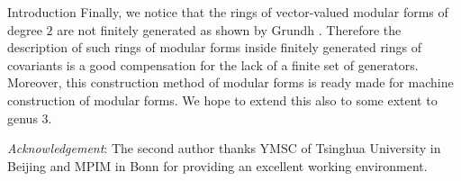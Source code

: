 \documentclass[12pt]{amsart}
\numberwithin{equation}{section}
\numberwithin{equation}{section}
\theoremstyle{definition}
\theoremstyle{remark}
\begin{document}
\begin{section}{Introduction}
Finally, we notice that the rings of vector-valued modular forms of degree $2$
are not finitely generated as shown by Grundh \cite[p.\ 234]{BGHZ}. Therefore the description
of such rings of modular forms inside finitely generated rings of covariants
is a good compensation for the lack of a finite set of generators. 
Moreover, this construction method of modular forms is ready made for 
machine construction of modular forms.
We hope to extend  this also to some extent to genus $3$.

\bigskip

{\sl Acknowledgement}:
The second author thanks YMSC of Tsinghua University in Beijing and MPIM in Bonn
for providing an excellent working environment.
\end{section}
\tableofcontents
\end{document}
